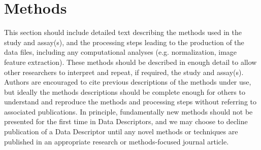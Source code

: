 \section{Methods}
This section should include detailed text describing the methods used in the study and assay(s), and the processing steps leading to the production of the data files, including any computational analyses (e.g. normalization, image feature extraction). These methods should be described in enough detail to allow other researchers to interpret and repeat, if required, the study and assay(s).  Authors are encouraged to cite previous descriptions of the methods under use, but ideally the methods descriptions should be complete enough for others to understand and reproduce the methods and processing steps without referring to associated publications.  In principle, fundamentally new methods should not be presented for the first time in Data Descriptors, and we may choose to decline publication of a Data Descriptor until any novel methods or techniques are published in an appropriate research or methods-focused journal article.

